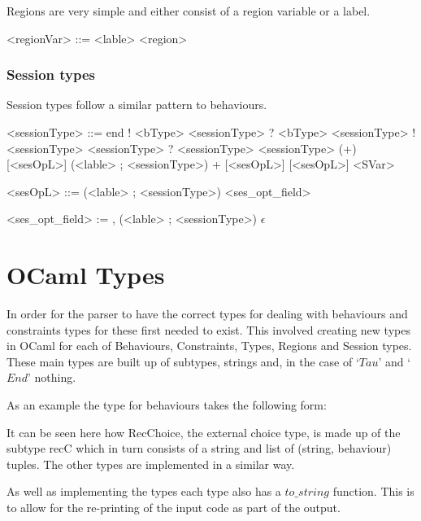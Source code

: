Regions are very simple and either consist of a region variable or a label. 

\begin{grammar}

<regionVar> ::= <lable>
\alt <region>

\end{grammar}

\subsubsection{Session types}

Session types follow a similar pattern to behaviours.

\begin{grammar}

<sessionType> ::= end
\alt ! <bType> <sessionType>
\alt ? <bType> <sessionType>
\alt ! <sessionType> <sessionType>
\alt ? <sessionType> <sessionType>
\alt (+) [<sesOpL>] (<lable> ; <sessionType>)
\alt + [<sesOpL>] [<sesOpL>]
\alt <SVar>

<sesOpL> ::= (<lable> ; <sessionType>) <ses_opt_field>

<ses_opt_field> := , (<lable> ; <sessionType>)
\alt $\epsilon$

\end{grammar}

\section{OCaml Types}

In order for the parser to have the correct types for dealing with behaviours and constraints types for these first needed to exist. This involved creating new types in OCaml for each of Behaviours, Constraints, Types, Regions and Session types. These main types are built up of subtypes, strings and, in the case of `$Tau$' and `$End$' nothing. 

As an example the type for behaviours takes the following form: 



It can be seen here how RecChoice, the external choice type, is made up of the subtype recC which in turn consists of a string and list of (string, behaviour) tuples. The other types are implemented in a similar way. 

As well as implementing the types each type also has a $to\_string$ function. This is to allow for the re-printing of the input code as part of the output. 


